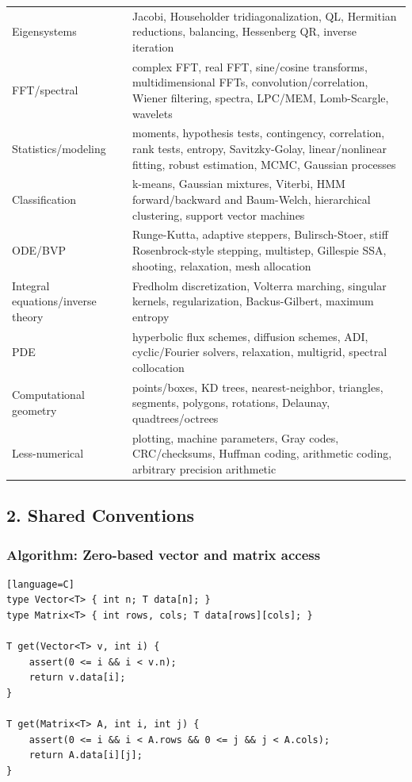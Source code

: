 \documentclass[11pt]{article}
\begin{document}
\begin{longtable}[]{@{}
  >{\raggedright\arraybackslash}p{}
  >{\raggedright\arraybackslash}p{}@{}}
Eigensystems & Jacobi, Householder tridiagonalization, QL, Hermitian reductions, balancing, Hessenberg QR, inverse iteration \\
FFT/spectral & complex FFT, real FFT, sine/cosine transforms, multidimensional FFTs, convolution/correlation, Wiener filtering, spectra, LPC/MEM, Lomb-Scargle, wavelets \\
Statistics/modeling & moments, hypothesis tests, contingency, correlation, rank tests, entropy, Savitzky-Golay, linear/nonlinear fitting, robust estimation, MCMC, Gaussian processes \\
Classification & k-means, Gaussian mixtures, Viterbi, HMM forward/backward and Baum-Welch, hierarchical clustering, support vector machines \\
ODE/BVP & Runge-Kutta, adaptive steppers, Bulirsch-Stoer, stiff Rosenbrock-style stepping, multistep, Gillespie SSA, shooting, relaxation, mesh allocation \\
Integral equations/inverse theory & Fredholm discretization, Volterra marching, singular kernels, regularization, Backus-Gilbert, maximum entropy \\
PDE & hyperbolic flux schemes, diffusion schemes, ADI, cyclic/Fourier solvers, relaxation, multigrid, spectral collocation \\
Computational geometry & points/boxes, KD trees, nearest-neighbor, triangles, segments, polygons, rotations, Delaunay, quadtrees/octrees \\
Less-numerical & plotting, machine parameters, Gray codes, CRC/checksums, Huffman coding, arithmetic coding, arbitrary precision arithmetic \\
\end{longtable}

\subsection{2. Shared Conventions}\label{shared-conventions}

\subsubsection{Algorithm: Zero-based vector and matrix access}\label{algorithm-zero-based-vector-and-matrix-access}

\begin{verbatim}[language=C]
type Vector<T> { int n; T data[n]; }
type Matrix<T> { int rows, cols; T data[rows][cols]; }

T get(Vector<T> v, int i) {
    assert(0 <= i && i < v.n);
    return v.data[i];
}

T get(Matrix<T> A, int i, int j) {
    assert(0 <= i && i < A.rows && 0 <= j && j < A.cols);
    return A.data[i][j];
}
\end{verbatim}
\end{document}
